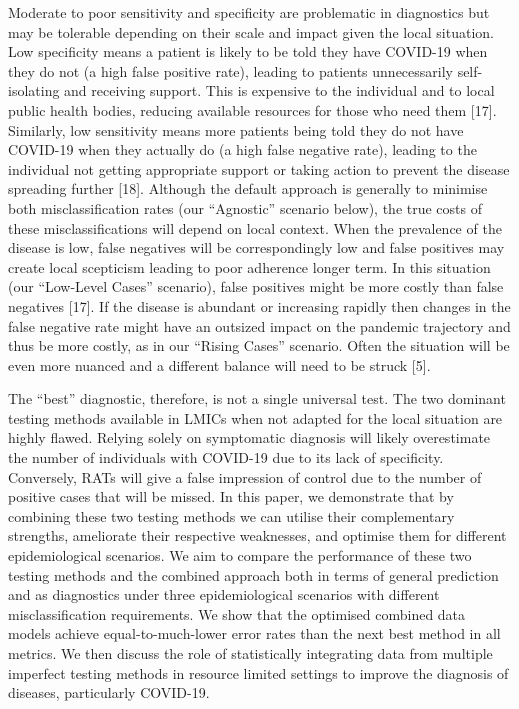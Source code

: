 \documentclass[]{elsarticle} %
\begin{document}
Moderate to poor sensitivity and specificity are problematic in diagnostics but may be tolerable depending on their scale and impact given the local situation.
Low specificity means a patient is likely to be told they have COVID-19 when they do not (a high false positive rate), leading to patients unnecessarily self-isolating and receiving support.
This is expensive to the individual and to local public health bodies, reducing available resources for those who need them {[}17{]}.
Similarly, low sensitivity means more patients being told they do not have COVID-19 when they actually do (a high false negative rate), leading to the individual not getting appropriate support or taking action to prevent the disease spreading further {[}18{]}.
Although the default approach is generally to minimise both misclassification rates (our ``Agnostic'' scenario below), the true costs of these misclassifications will depend on local context.
When the prevalence of the disease is low, false negatives will be correspondingly low and false positives may create local scepticism leading to poor adherence longer term.
In this situation (our ``Low-Level Cases'' scenario), false positives might be more costly than false negatives {[}17{]}.
If the disease is abundant or increasing rapidly then changes in the false negative rate might have an outsized impact on the pandemic trajectory and thus be more costly, as in our ``Rising Cases'' scenario.
Often the situation will be even more nuanced and a different balance will need to be struck {[}5{]}.

The ``best'' diagnostic, therefore, is not a single universal test.
The two dominant testing methods available in LMICs when not adapted for the local situation are highly flawed.
Relying solely on symptomatic diagnosis will likely overestimate the number of individuals with COVID-19 due to its lack of specificity.
Conversely, RATs will give a false impression of control due to the number of positive cases that will be missed.
In this paper, we demonstrate that by combining these two testing methods we can utilise their complementary strengths, ameliorate their respective weaknesses, and optimise them for different epidemiological scenarios.
We aim to compare the performance of these two testing methods and the combined approach both in terms of general prediction and as diagnostics under three epidemiological scenarios with different misclassification requirements.
We show that the optimised combined data models achieve equal-to-much-lower error rates than the next best method in all metrics.
We then discuss the role of statistically integrating data from multiple imperfect testing methods in resource limited settings to improve the diagnosis of diseases, particularly COVID-19.
\end{document}
